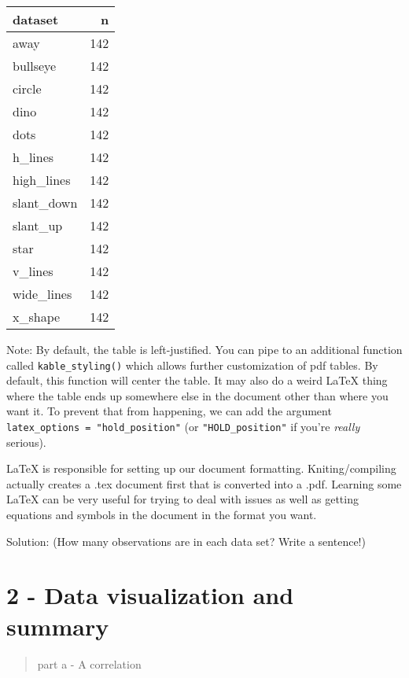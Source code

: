 \documentclass[
  letterpaper,
  DIV=11,
  numbers=noendperiod]{scrartcl}
\begin{document}
\begin{longtable}[]{@{}lr@{}}
\toprule\noalign{}
dataset & n \\
\midrule\noalign{}
\endhead
\bottomrule\noalign{}
\endlastfoot
away & 142 \\
bullseye & 142 \\
circle & 142 \\
dino & 142 \\
dots & 142 \\
h\_lines & 142 \\
high\_lines & 142 \\
slant\_down & 142 \\
slant\_up & 142 \\
star & 142 \\
v\_lines & 142 \\
wide\_lines & 142 \\
x\_shape & 142 \\
\end{longtable}

Note: By default, the table is left-justified. You can pipe to an
additional function called \texttt{kable\_styling()} which allows
further customization of pdf tables. By default, this function will
center the table. It may also do a weird LaTeX thing where the table
ends up somewhere else in the document other than where you want it. To
prevent that from happening, we can add the argument
\texttt{latex\_options\ =\ "hold\_position"} (or
\texttt{"HOLD\_position"} if you're \emph{really} serious).

LaTeX is responsible for setting up our document formatting.
Kniting/compiling actually creates a .tex document first that is
converted into a .pdf. Learning some LaTeX can be very useful for trying
to deal with issues as well as getting equations and symbols in the
document in the format you want.

Solution: (How many observations are in each data set? Write a
sentence!)

\newpage

\hypertarget{data-visualization-and-summary}{%
\section{2 - Data visualization and
summary}\label{data-visualization-and-summary}}

\begin{quote}
part a - A correlation
\end{quote}
\end{document}
